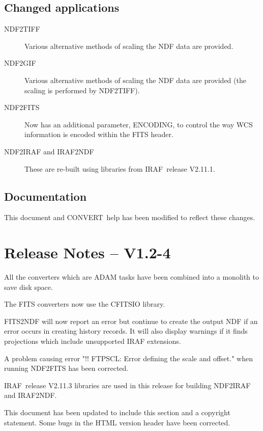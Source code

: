 \documentclass[twoside,11pt]{article}
\newcommand{\htmladdnormallink}[2]{#1}
\newcommand{\htmlref}[2]{#1}
\newcommand{\CONVERT}{{\footnotesize CONVERT}}
\newcommand{\IRAF}{{\footnotesize IRAF}}
\newcommand{\IRAFURL}{http://star-www.rl.ac.uk/iraf/web/iraf-homepage.html}
\newcommand{\IRAFref}{\htmladdnormallink{\IRAF}{\IRAFURL}}
\begin{document}
\subsection{Changed applications}
\begin{description}
\item[\htmlref{NDF2TIFF}{NDF2TIFF}] Various alternative methods of scaling the
NDF data are provided.
\item[\htmlref{NDF2GIF}{NDF2GIF}] Various alternative methods of scaling the
NDF data are provided (the scaling is performed by 
\htmlref{NDF2TIFF}{NDF2TIFF}).
\item[\htmlref{NDF2FITS}{NDF2FITS}] Now has an additional parameter, ENCODING,
to control the way WCS information is encoded within the FITS header.
\item[\htmlref{NDF2IRAF}{NDF2IRAF}
and
\htmlref{IRAF2NDF}{IRAF2NDF}]
These are re-built using libraries from \IRAFref\ release V2.11.1.
\end{description}


\subsection{Documentation}
This document and \CONVERT\ help has been modified to reflect these changes.

\section{Release Notes -- V1.2-4}
  
All the converters which are ADAM tasks have been combined into a monolith
to save disk space.

The FITS converters now use the CFITSIO library.

\htmlref{FITS2NDF}{FITS2NDF}
 will now report an error but continue to create the output NDF 
if an error occurs in creating history records.  It will also display 
warnings if it finds projections which include unsupported IRAF extensions.

A problem causing error "!! FTPSCL: Error defining the scale and offset."
when running 
\htmlref{NDF2FITS}{NDF2FITS}
has been corrected.

\IRAFref\ release V2.11.3 libraries are used in this release for building
\htmlref{NDF2IRAF}{NDF2IRAF}
and
\htmlref{IRAF2NDF}{IRAF2NDF}.

This document has been updated to include this section and a copyright 
statement. Some bugs in the HTML version header have been corrected.
\end{document}
